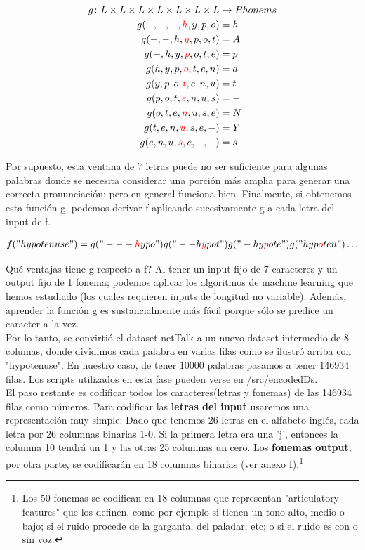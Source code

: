 \documentclass[paper=a4, fontsize=11pt]{scrartcl} %
\numberwithin{equation}{section} %
\numberwithin{figure}{section} %
\numberwithin{table}{section} %
\begin{document}
\begin{align*}
  g \colon L \times L \times L \times L \times L \times L \times L  & \to Phonems \\
  g(-,-,-,\textcolor{red}{h},y,p,o) &= h \\  
  g(-,-,h,\textcolor{red}{y},p,o,t) &= A \\
  g(-,h,y,\textcolor{red}{p},o,t,e) &= p \\
  g(h,y,p,\textcolor{red}{o},t,e,n) &= a \\
  g(y,p,o,\textcolor{red}{t},e,n,u) &= t \\
  g(p,o,t,\textcolor{red}{e},n,u,s)& = - \\
  g(o,t,e,\textcolor{red}{n},u,s,e)& = N \\
  g(t,e,n,\textcolor{red}{u},s,e,-)& = Y \\
  g(e,n,u,\textcolor{red}{s},e,-,-) &= s
\end{align*}

Por supuesto, esta ventana de 7 letras puede no ser suficiente para algunas palabras donde se necesita considerar una porción más amplia para generar una correcta pronunciación; pero en general funciona bien. Finalmente, si obtenemos esta función g, podemos derivar f aplicando sucesivamente g a cada letra del input de f. 

\begin{align*}
  f("hypotenuse") = g("---\textcolor{red}{h}ypo")  g("--h\textcolor{red}{y}pot") g("-hy\textcolor{red}{p}ote") g("hyp\textcolor{red}{o}ten")  \ldots
\end{align*}


Qué ventajas tiene g respecto a f? Al tener un input fijo de 7 caracteres y un output fijo de 1 fonema; podemos aplicar los algoritmos de machine learning que hemos estudiado (los cuales requieren inputs de longitud no variable). Además, aprender la función g es sustancialmente más fácil porque sólo se predice un caracter a la vez. \\

Por lo tanto, se convirtió el dataset netTalk a un nuevo dataset intermedio de 8 columas, donde dividimos cada palabra en varias filas como se ilustró arriba con "hypotenuse". En nuestro caso, de tener 10000 palabras pasamos a tener 146934 filas. Los scripts utilizados en esta fase pueden verse en /src/encodedDs. \\

El paso restante es codificar todos los caracteres(letras y fonemas) de las 146934 filas como números. Para codificar las \textbf{letras del input} usaremos una representación muy simple: Dado que tenemos 26 letras en el alfabeto inglés, cada letra por 26 columnas binarias 1-0. Si la primera letra era una 'j', entonces la columna 10 tendrá un 1 y las otras 25 columnas un cero. Los \textbf{fonemas output}, por otra parte, se codificarán en 18 columnas binarias (ver anexo I).\footnote{Los 50 fonemas se codifican en 18 columnas que representan "articulatory features" que los definen, como por ejemplo si tienen un tono alto, medio o bajo; si el ruido procede de la garganta, del paladar, etc; o si el ruido es con o sin voz.} \\
\end{document}
